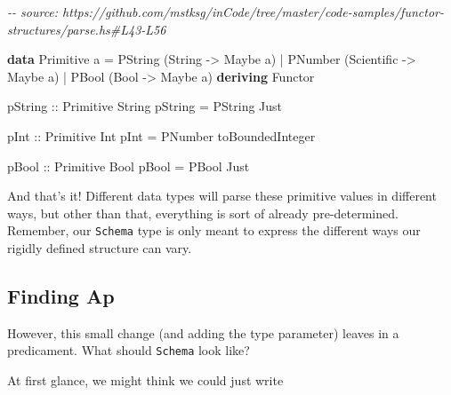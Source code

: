 \documentclass[]{article}
\newenvironment{Shaded}{}{}
\newcommand{\CommentTok}[1]{\textcolor[rgb]{0.38,0.63,0.69}{\textit{#1}}}
\newcommand{\DataTypeTok}[1]{\textcolor[rgb]{0.56,0.13,0.00}{#1}}
\newcommand{\KeywordTok}[1]{\textcolor[rgb]{0.00,0.44,0.13}{\textbf{#1}}}
\newcommand{\NormalTok}[1]{#1}
\newcommand{\OperatorTok}[1]{\textcolor[rgb]{0.40,0.40,0.40}{#1}}
\newcommand{\OtherTok}[1]{\textcolor[rgb]{0.00,0.44,0.13}{#1}}
\begin{document}
\begin{Shaded}
\begin{Highlighting}[]
\CommentTok{{-}{-} source: https://github.com/mstksg/inCode/tree/master/code{-}samples/functor{-}structures/parse.hs\#L43{-}L56}

\KeywordTok{data} \DataTypeTok{Primitive}\NormalTok{ a }\OtherTok{=}
      \DataTypeTok{PString}\NormalTok{ (}\DataTypeTok{String} \OtherTok{{-}>} \DataTypeTok{Maybe}\NormalTok{ a)}
    \OperatorTok{|} \DataTypeTok{PNumber}\NormalTok{ (}\DataTypeTok{Scientific} \OtherTok{{-}>} \DataTypeTok{Maybe}\NormalTok{ a)}
    \OperatorTok{|} \DataTypeTok{PBool}\NormalTok{   (}\DataTypeTok{Bool} \OtherTok{{-}>} \DataTypeTok{Maybe}\NormalTok{ a)}
  \KeywordTok{deriving} \DataTypeTok{Functor}

\OtherTok{pString ::} \DataTypeTok{Primitive} \DataTypeTok{String}
\NormalTok{pString }\OtherTok{=} \DataTypeTok{PString} \DataTypeTok{Just}

\OtherTok{pInt ::} \DataTypeTok{Primitive} \DataTypeTok{Int}
\NormalTok{pInt }\OtherTok{=} \DataTypeTok{PNumber}\NormalTok{ toBoundedInteger}

\OtherTok{pBool ::} \DataTypeTok{Primitive} \DataTypeTok{Bool}
\NormalTok{pBool }\OtherTok{=} \DataTypeTok{PBool} \DataTypeTok{Just}
\end{Highlighting}
\end{Shaded}

And that's it! Different data types will parse these primitive values in
different ways, but other than that, everything is sort of already
pre-determined. Remember, our \texttt{Schema} type is only meant to express the
different ways our rigidly defined structure can vary.

\hypertarget{finding-ap}{%
\subsection{Finding Ap}\label{finding-ap}}

However, this small change (and adding the type parameter) leaves in a
predicament. What should \texttt{Schema} look like?

At first glance, we might think we could just write
\end{document}
